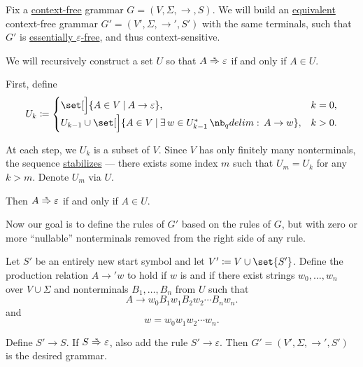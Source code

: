 \begin{algorithm}\label{alg:epsilon_rule_removal}
  Fix a \hyperref[def:chomsky_hierarchy/context_free]{context-free} grammar \( G = (V, \Sigma, \to, S) \). We will build an \hyperref[def:formal_grammar/equivalent]{equivalent} context-free grammar \( G' = (V', \Sigma, \to', S') \) with the same terminals, such that \( G' \) is \hyperref[def:epsilon_free_grammar]{essentially \( \varepsilon \)-free}, and thus context-sensitive.

  \begin{thmenum}
     We will recursively construct a set \( U \) so that \( A \reloset {*} \Rightarrow \varepsilon \) if and only if \( A \in U \).

    First, define
    \begin{equation*}
      U_k \coloneqq \begin{cases}
        \set[\Big]{ A \in V \given A \to \varepsilon },                               &k = 0, \\
        U_{k-1} \cup \set[\Big]{ A \in V \given \qexists*{w \in U_{k-1}^*} A \to w }, &k > 0.
      \end{cases}
    \end{equation*}

    At each step, we \( U_k \) is a subset of \( V \). Since \( V \) has only finitely many nonterminals, the sequence \hyperref[def:stabilizing_sequence]{stabilizes} --- there exists some index \( m \) such that \( U_m = U_k \) for any \( k > m \). Denote \( U_m \) via \( U \).

    Then \( A \reloset {*} \Rightarrow \varepsilon \) if and only if \( A \in U \).

     Now our goal is to define the rules of \( G' \) based on the rules of \( G \), but with zero or more \enquote{nullable} nonterminals removed from the right side of any rule.

    Let \( S' \) be an entirely new start symbol and let \( V' \coloneqq V \cup \set{ S' } \). Define the production relation \( A \to' w \) to hold if \( w \) is  and if there exist strings \( w_0, \ldots, w_n \) over \( V \cup \Sigma \) and nonterminals \( B_1, \ldots, B_n \) from \( U \) such that
    \begin{equation*}
      A \to w_0 B_1 w_1 B_2 w_2 \cdots B_n w_n.
    \end{equation*}
    and
    \begin{equation*}
      w = w_0 w_1 w_2 \cdots w_n.
    \end{equation*}

     Define \( S' \to S \). If \( S \reloset {*} \Rightarrow \varepsilon \), also add the rule \( S' \to \varepsilon \). Then \( G' = (V', \Sigma, \to', S') \) is the desired grammar.
  \end{thmenum}
\end{algorithm}

